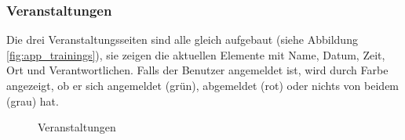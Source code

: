 \newpage
\FloatBarrier
\subsubsection{Veranstaltungen}
Die drei Veranstaltungsseiten sind alle gleich aufgebaut (siehe Abbildung \ref{fig:app_trainings}), sie zeigen die aktuellen Elemente mit Name, Datum, Zeit, Ort und Verantwortlichen. Falls der Benutzer angemeldet ist, wird durch Farbe angezeigt, ob er sich angemeldet (grün), abgemeldet (rot) oder nichts von beidem (grau) hat.
\begin{figure}[ht]
\centering
{}
\label{fig:app_singinobjects}
\caption{Veranstaltungen}
\end{figure}

